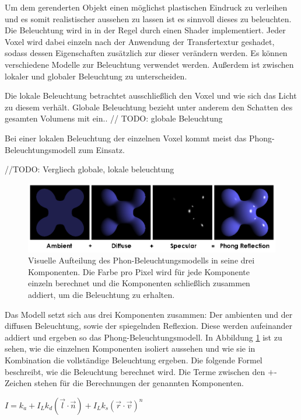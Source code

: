 Um dem gerenderten Objekt einen möglichst plastischen Eindruck zu verleihen und es somit realistischer aussehen zu lassen ist es sinnvoll dieses zu beleuchten. 
Die Beleuchtung wird in in der Regel durch einen Shader implementiert. Jeder Voxel wird dabei einzeln nach der Anwendung der Transfertextur geshadet, sodass dessen Eigenschaften zusätzlich zur dieser verändern werden. Es können verschiedene Modelle zur Beleuchtung verwendet werden. Außerdem ist zwischen lokaler und globaler Beleuchtung zu unterscheiden.


Die lokale Beleuchtung betrachtet ausschließlich den Voxel und wie sich das Licht zu diesem verhält. 
Globale Beleuchtung bezieht unter anderem den Schatten des gesamten Volumens mit ein..
// TODO:
globale Beleuchtung

Bei einer lokalen Beleuchtung der einzelnen Voxel kommt meist das Phong-Beleuchtungsmodell zum Einsatz. 

//TODO: Vergliech globale, lokale beleuchtung

\begin{figure}
	\centering
	\includegraphics[width=0.7\linewidth]{images/Phong_components_version_4.png}
	\caption{Visuelle Aufteilung des Phon-Beleuchtungsmodells in seine drei Komponenten. Die Farbe pro Pixel wird für jede Komponente einzeln berechnet und die Komponenten schließlich zusammen addiert, um die Beleuchtung zu erhalten. }
	\label{img:phong}
\end{figure}

Das Modell setzt sich aus drei Komponenten zusammen: Der ambienten und der diffusen Beleuchtung, sowie der spiegelnden Reflexion. Diese werden aufeinander addiert und ergeben so das Phong-Beleuchtungsmodell.  In Abbildung \ref{img:phong} ist zu sehen, wie die einzelnen Komponenten isoliert aussehen und wie sie in Kombination die vollständige Beleuchtung ergeben.
Die folgende Formel beschreibt, wie die Beleuchtung berechnet wird. Die Terme zwischen den $+$-Zeichen stehen für die Berechnungen der genannten Komponenten.

$I = k_{a}+I_{L}k_{d}(\vec{l}\cdot\vec{n})+I_{L}k_{s}(\vec{r}\cdot\vec{v})^n$

